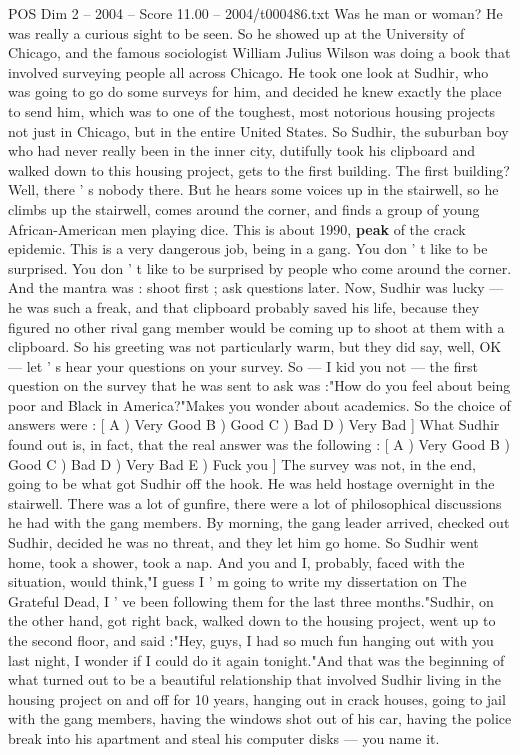 \begin{textsample}{POS Dim 2 – 2004 – Score 11.00 – 2004/t000486.txt}
Was he man or woman?
He was really a curious sight to be seen.
So he showed up at the University of Chicago, and the famous sociologist William Julius Wilson was doing a book that involved surveying people all across Chicago.
He took one look at Sudhir, who was going to go do some surveys for him, and decided he knew exactly the place to send him, which was to one of the toughest, most notorious housing projects not just in Chicago, but in the entire United States.
So Sudhir, the suburban boy who had never really been in the inner city, dutifully took his clipboard and walked down to this housing project, gets to the first building.
The first building?
Well, there ' s nobody there.
But he hears some voices up in the stairwell, so he climbs up the stairwell, comes around the corner, and finds a group of young African-American men playing dice.
This is about 1990, \textbf{peak} of the crack epidemic.
This is a very dangerous job, being in a gang.
You don ' t like to be surprised.
You don ' t like to be surprised by people who come around the corner.
And the mantra was : shoot first ; ask questions later.
Now, Sudhir was lucky — he was such a freak, and that clipboard probably saved his life, because they figured no other rival gang member would be coming up to shoot at them with a clipboard.
So his greeting was not particularly warm, but they did say, well, OK — let ' s hear your questions on your survey.
So — I kid you not — the first question on the survey that he was sent to ask was :"How do you feel about being poor and Black in America?"Makes you wonder about academics.
So the choice of answers were : [ A ) Very Good B ) Good C ) Bad D ) Very Bad ] What Sudhir found out is, in fact, that the real answer was the following : [ A ) Very Good B ) Good C ) Bad D ) Very Bad E ) Fuck you ] The survey was not, in the end, going to be what got Sudhir off the hook.
He was held hostage overnight in the stairwell.
There was a lot of gunfire, there were a lot of philosophical discussions he had with the gang members.
By morning, the gang leader arrived, checked out Sudhir, decided he was no threat, and they let him go home.
So Sudhir went home, took a shower, took a nap.
And you and I, probably, faced with the situation, would think,"I guess I ' m going to write my dissertation on The Grateful Dead, I ' ve been following them for the last three months."Sudhir, on the other hand, got right back, walked down to the housing project, went up to the second floor, and said :"Hey, guys, I had so much fun hanging out with you last night, I wonder if I could do it again tonight."And that was the beginning of what turned out to be a beautiful relationship that involved Sudhir living in the housing project on and off for 10 years, hanging out in crack houses, going to jail with the gang members, having the windows shot out of his car, having the police break into his apartment and steal his computer disks — you name it.

\end{textsample}
